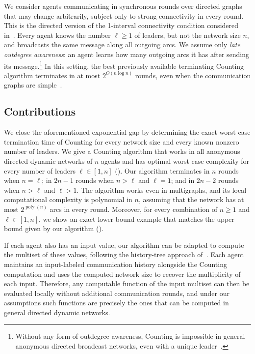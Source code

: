 \documentclass[11pt]{article}
\begin{document}
We consider agents communicating in synchronous
rounds over directed graphs that may change arbitrarily, subject only to
strong connectivity in every round. This is the directed version of the 1-interval connectivity
condition considered in~\cite{KLO10}. 
Every agent knows the number \(\ell\geq1\) of leaders,
but not the network size \(n\), and broadcasts the same message along all
outgoing arcs. We assume only \emph{late outdegree awareness}: an agent
learns how many outgoing arcs it has after sending its message.\footnote{Without any form of outdegree awareness, Counting is impossible in general anonymous directed broadcast networks, even with a unique leader~\cite[Section~3.3]{VIG24}.}
In this setting, the best previously available terminating Counting algorithm
terminates in at most $2^{O(n\log n)}$ rounds, even when the communication graphs
are simple~\cite{VIG24}. 

\subsection{Contributions}
We close the aforementioned exponential gap by determining the exact worst-case termination time
of Counting for every network size and every known nonzero number of
leaders. We give a Counting algorithm that works in all anonymous directed dynamic networks of $n$ agents and has optimal worst-case complexity for every number of leaders $\ell \in [1,n]$ (). Our algorithm terminates in $n$ rounds when $n=\ell$; in $2n-1$ rounds when $n > \ell$ and $\ell=1$; and in $2n-2$ rounds when $n> \ell$ and $\ell >1$. The algorithm works even in multigraphs, and its local computational complexity is polynomial in $n$, assuming that the network has at most $2^{\operatorname{poly}(n)}$ arcs in every round. Moreover, for every combination of $n\geq 1$ and $\ell \in [1,n]$, we show an exact lower-bound example that matches the upper bound given by our algorithm ().

If each agent also has an input value, our algorithm can be adapted to
compute the multiset of these values, following the history-tree approach
of~\cite{DV22,DLV26,VIG24}. Each agent maintains an input-labeled
communication history alongside the Counting computation and uses the
computed network size to recover the multiplicity of each input. Therefore, any computable function of the input multiset can then be evaluated
locally without additional communication rounds, and under our assumptions
such functions are precisely the ones that can be computed in general
directed dynamic networks.
\end{document}
